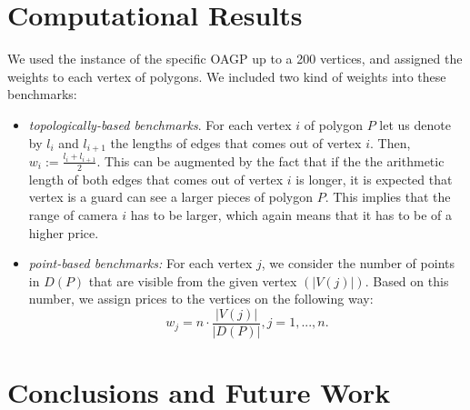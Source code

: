 \documentclass[runningheads,a4paper]{elsarticle}
\begin{document}
     \section{Computational Results}
       We used the instance of the specific OAGP up to a 200 vertices, and assigned the weights to each vertex of polygons. We included two kind of weights into these benchmarks:
       \begin{itemize}
       	  \item \emph{topologically-based benchmarks}. For each vertex $i$ of polygon $P$ let us denote by $l_i$ and $l_{i+1}$ the lengths of edges that comes out of vertex $i$. Then, $w_i := \frac{l_i + l_{i+1}}{2}$. This can be augmented by the fact that if the the arithmetic length of both edges that comes out of vertex $i$ is longer, it is expected that vertex is a guard can see a larger pieces of polygon $P$. This implies that the range of camera $i$ has to be larger, which again means that it has to be of a higher price.
       	 \item \emph{point-based benchmarks:} For each vertex $j$, we consider the number of points in $D(P)$ that are visible from the given vertex $(|V(j)|)$. Based on this number, we assign prices to the vertices on the following way:
       	 \begin{equation}
       	   w_j = n \cdot \frac{|V(j)|}{|D(P)|}, j=1,...,n. 
       	 \end{equation}
       \end{itemize}
     \section{Conclusions and Future Work}



    
    
\end{document}
